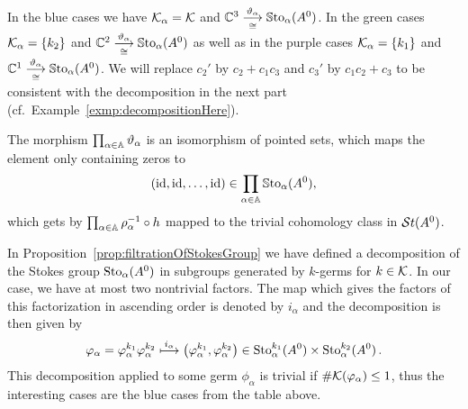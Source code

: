 In the \textcolor{blue!75!black}{blue} cases we have $\mathcal{K}_\alpha=\mathcal{K}$ and
$\mathbb{C}^3\overset{\vartheta_\alpha}{\underset{\cong}{\longrightarrow}}\operatorname{\mathbb{S}to}_\alpha(A^0)$.
In the \textcolor{green!50!black}{green} cases $\mathcal{K}_\alpha=\{k_2\}$ and
$\mathbb{C}^2\overset{\vartheta_\alpha}{\underset{\cong}{\longrightarrow}}\operatorname{\mathbb{S}to}_\alpha(A^0)$
as well as in the \textcolor{purple!75!black}{purple} cases
$\mathcal{K}_\alpha=\{k_1\}$ and
$\mathbb{C}^1\overset{\vartheta_\alpha}{\underset{\cong}{\longrightarrow}}\operatorname{\mathbb{S}to}_\alpha(A^0)$.
We will replace $c_2'$ by $c_2+c_1c_3$ and $c_3'$ by $c_1c_2+c_3$ to be
consistent with the decomposition in the next part
(cf.\ Example~\ref{exmp:decompositionHere}).
\begin{cor}
  The morphism $\prod_{\alpha\in\mathbb{A}}\vartheta_\alpha$ is an isomorphism of
  pointed sets, which maps the element only containing zeros to
  \[
    (\operatorname{id},\operatorname{id},\dots,\operatorname{id})\in\prod_{\alpha\in\mathbb{A}}\operatorname{\mathbb{S}to}_\alpha(A^0),
  \]
  which gets by $\prod_{\alpha\in\mathbb{A}}\rho_\alpha^{-1}\circ h$ mapped to the
  trivial cohomology class in $\mathcal{S}{}t(A^0)$.
\end{cor}

In Proposition~\ref{prop:filtrationOfStokesGroup} we have defined a
decomposition of the Stokes group $\operatorname{Sto}_\alpha(A^0)$ in subgroups generated by
$k$-germs for $k\in\mathcal{K}$.
In our case, we have at most two nontrivial factors.
The map which gives the factors of this factorization in ascending order is
denoted by $i_\alpha$ and the decomposition is then given by
\[
  \varphi_\alpha=\varphi_\alpha^{k_1} \varphi_\alpha^{k_2}
  \overset{i_\alpha}\longmapsto
    \left(\varphi_\alpha^{k_1},\varphi_\alpha^{k_2}\right)
    \in\operatorname{Sto}_\alpha^{k_1}(A^0)\times\operatorname{Sto}_\alpha^{k_2}(A^0) \,.
\]
This decomposition applied to some germ $\phi_\alpha$ is trivial if
$\#\mathcal{K}(\varphi_\alpha)\leq1$, thus the interesting cases are the
\textcolor{blue!75!black}{blue} cases from the table above.

